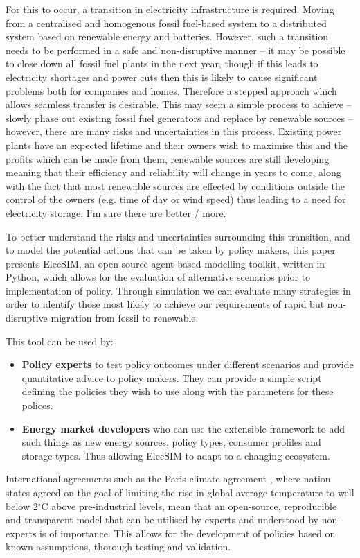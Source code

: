 For this to occur, a transition in electricity infrastructure is required. Moving from a centralised and homogenous fossil fuel-based system to a distributed system based on renewable energy and batteries. However, such a transition needs to be performed in a safe and non-disruptive manner -- it may be possible to close down all fossil fuel plants in the next year, though if this leads to electricity shortages and power cuts then this is likely to cause significant problems both for companies and homes. Therefore a stepped approach which allows seamless transfer is desirable. This may seem a simple process to achieve -- slowly phase out existing fossil fuel generators and replace by renewable sources -- however, there are many risks and uncertainties in this process. Existing power plants have an expected lifetime and their owners wish to maximise this and the profits which can be made from them, renewable sources are still developing meaning that their efficiency and reliability will change in years to come, along with the fact that most renewable sources are effected by conditions outside the control of the owners (e.g. time of day or wind speed) thus leading to a need for electricity storage. {\color{red}I'm sure there are better / more.}	

To better understand the risks and uncertainties surrounding this transition, and to model the potential actions that can be taken by policy makers, this paper presents ElecSIM, an open source agent-based modelling toolkit, written in Python, which allows for the evaluation of alternative scenarios prior to implementation of policy. Through simulation we can evaluate many strategies in order to identify those most likely to achieve our requirements of rapid but non-disruptive migration from fossil to renewable.

This tool can be used by:
\begin{itemize}
	\item {\bf Policy experts} to test policy outcomes under different scenarios and provide quantitative advice to policy makers. They can provide a simple script defining the policies they wish to use along with the parameters for these polices.
	\item {\bf Energy market developers} who can use the extensible framework to add such things as new energy sources, policy types, consumer profiles and storage types. Thus allowing ElecSIM to adapt to a changing ecosystem.
\end{itemize}
International agreements such as the Paris climate agreement \cite{May2002}, where nation states agreed on the goal of limiting the rise in global average temperature to well below 2$^\circ$C above pre-industrial levels, mean that an open-source, reproducible and transparent model that can be utilised by experts and understood by non-experts is of importance. This allows for the development of policies based on known assumptions, thorough testing and validation.


